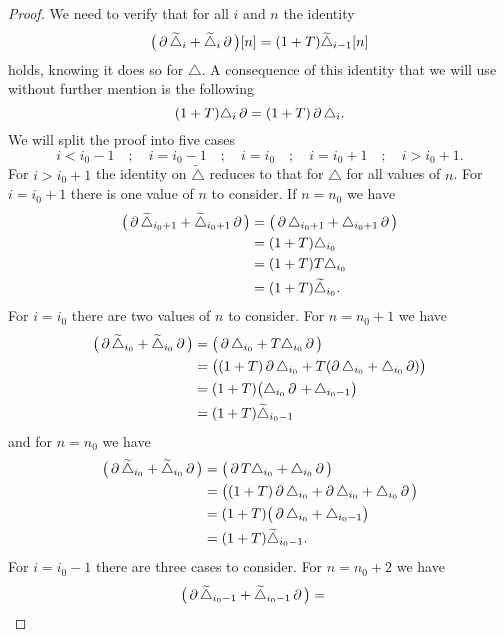 \begin{proof}
	We need to verify that for all $i$ and $n$ the identity
	\[
	\big(\operatorname{\partial} \widetilde\triangle_{i} + \widetilde\triangle_{i}\operatorname{\partial}\big)[n] =
	(1+T) \widetilde\triangle_{i-1}[n]
	\]
	holds, knowing it does so for $\triangle$.
	A consequence of this identity that we will use without further mention is the following
	\[
	(1+T)\triangle_i\operatorname{\partial} = (1+T)\operatorname{\partial}\triangle_i.
	\]
	We will split the proof into five cases
	\[
	i < i_0-1 \quad;\quad i = i_0-1 \quad;\quad i = i_0 \quad;\quad i = i_0+1 \quad;\quad i > i_0+1.
	\]
	For $i > i_0+1$ the identity on $\widetilde\triangle$ reduces to that for $\triangle$ for all values of $n$.
	For $i = i_0+1$ there is one value of $n$ to consider.
	If $n = n_0$ we have
	\begin{align*}
		\big(\operatorname{\partial} \widetilde\triangle_{i_0+1} + \widetilde\triangle_{i_0+1} \operatorname{\partial}\big) &=
		\big(\operatorname{\partial} \triangle_{i_0+1} + \triangle_{i_0+1} \operatorname{\partial}\big) \\ &=
		(1+T)\triangle_{i_0} \\ &=
		(1+T)T\triangle_{i_0} \\ &=
		(1+T)\widetilde\triangle_{i_0}.
	\end{align*}
	For $i = i_0$ there are two values of $n$ to consider.
	For $n = n_0+1$ we have
	\begin{align*}
		\big(\operatorname{\partial} \widetilde\triangle_{i_0} + \widetilde\triangle_{i_0} \operatorname{\partial}\big) &=
		\big(\operatorname{\partial} \triangle_{i_0} + T\triangle_{i_0} \operatorname{\partial}\big) \\ &=
		\big((1+T)\operatorname{\partial}\triangle_{i_0} + T(\operatorname{\partial}\triangle_{i_0} + \triangle_{i_0}\operatorname{\partial})\big) \\ &=
		(1+T)\big(\triangle_{i_0}\operatorname{\partial} \,+\, \triangle_{i_0-1}\big) \\ &=
		(1+T)\widetilde\triangle_{i_0-1}
	\end{align*}
	and for $n = n_0$ we have
	\begin{align*}
		\big(\operatorname{\partial} \widetilde\triangle_{i_0} + \widetilde\triangle_{i_0} \operatorname{\partial}\big) &=
		\big(\operatorname{\partial} T \triangle_{i_0} + \triangle_{i_0} \operatorname{\partial}\big) \\ &=
		\big((1+T)\operatorname{\partial}\triangle_{i_0} + \operatorname{\partial}\triangle_{i_0} + \triangle_{i_0}\operatorname{\partial}\big) \\ &=
		(1+T)\big(\operatorname{\partial}\triangle_{i_0} + \triangle_{i_0-1}\big) \\ &=
		(1+T)\widetilde\triangle_{i_0-1}.
	\end{align*}
	For $i = i_0-1$ there are three cases to consider.
	For $n = n_0+2$ we have
	\begin{align*}
		\big(\bd\widetilde\triangle_{i_0-1} + \widetilde\triangle_{i_0-1} \bd\big) &=

\end{align*}
\end{proof}
